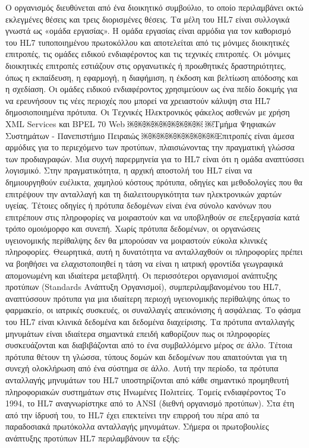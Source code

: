 Ο οργανισμός διευθύνεται από ένα διοικητικό συμβούλιο, το οποίο περιλαμβάνει οκτώ εκλεγμένες θέσεις και τρεις διορισμένες θέσεις. Τα μέλη του HL7 είναι συλλογικά γνωστά ως «ομάδα εργασίας». Η ομάδα εργασίας είναι αρμόδια για τον καθορισμό του HL7 τυποποιημένου πρωτοκόλλου και αποτελείται από τις μόνιμες διοικητικές επιτροπές, τις ομάδες ειδικού ενδιαφέροντος και τις τεχνικές επιτροπές. Οι μόνιμες διοικητικές επιτροπές εστιάζουν στις οργανωτικές ή προωθητικές δραστηριότητες, όπως η εκπαίδευση, η εφαρμογή, η διαφήμιση, η έκδοση και βελτίωση απόδοσης και η σχεδίαση. Οι ομάδες ειδικού ενδιαφέροντος χρησιμεύουν ως ένα πεδίο δοκιμής για να ερευνήσουν τις νέες περιοχές που μπορεί να χρειαστούν κάλυψη στα HL7 δημοσιοποιημένα πρότυπα. Οι Τεχνικές
Ηλεκτρονικός φάκελος ασθενών με χρήση XML Services και BPEL 70 Web
￼￼￼￼￼￼￼￼￼
￼Τμήμα Ψηφιακών Συστημάτων - Πανεπιστήμιο Πειραιώς
￼￼￼￼￼￼￼￼￼Επιτροπές είναι άμεσα αρμόδιες για το περιεχόμενο των προτύπων, πλαισιώνοντας την πραγματική γλώσσα των προδιαγραφών.
Μια συχνή παρερμηνεία για το HL7 είναι ότι η ομάδα αναπτύσσει λογισμικό. Στην πραγματικότητα, η αρχική αποστολή του HL7 είναι να δημιουργηθούν ευέλικτα, χαμηλού κόστους πρότυπα, οδηγίες και μεθοδολογίες που θα επιτρέψουν την ανταλλαγή και τη διαλειτουργικότητα των ηλεκτρονικών χαρτών υγείας. Τέτοιες οδηγίες ή πρότυπα δεδομένων είναι ένα σύνολο κανόνων που επιτρέπουν στις πληροφορίες να μοιραστούν και να υποβληθούν σε επεξεργασία κατά τρόπο ομοιόμορφο και συνεπή. Χωρίς πρότυπα δεδομένων, οι οργανώσεις υγειονομικής περίθαλψης δεν θα μπορούσαν να μοιραστούν εύκολα κλινικές πληροφορίες. Θεωρητικά, αυτή η δυνατότητα να ανταλλαχθούν οι πληροφορίες πρέπει να βοηθήσει να ελαχιστοποιηθεί η τάση να είναι η ιατρική φροντίδα γεωγραφικά απομονωμένη και ιδιαίτερα μεταβλητή.
Οι περισσότεροι οργανισμοί ανάπτυξης προτύπων (Standards Ανάπτυξη Οργανισμοί), συμπεριλαμβανομένου του HL7, αναπτύσσουν πρότυπα για μια ιδιαίτερη περιοχή υγειονομικής περίθαλψης όπως το φαρμακείο, οι ιατρικές συσκευές, οι συναλλαγές απεικόνισης ή ασφάλειας. Το φάσμα του HL7 είναι κλινικά δεδομένα και δεδομένα διαχείρισης. Τα πρότυπα ανταλλαγής μηνυμάτων είναι ιδιαίτερα σημαντικά επειδή καθορίζουν πως οι πληροφορίες συσκευάζονται και διαβιβάζονται από το ένα συμβαλλόμενο μέρος σε άλλο. Τέτοια πρότυπα θέτουν τη γλώσσα, τύπους δομών και δεδομένων που απαιτούνται για τη συνεχή ολοκλήρωση από ένα σύστημα σε άλλο. Αυτή την περίοδο, τα πρότυπα ανταλλαγής μηνυμάτων του HL7 υποστηρίζονται από κάθε σημαντικό προμηθευτή πληροφοριακών συστημάτων στις Ηνωμένες Πολιτείες.
Τομείς ενδιαφέροντος
Το 1994, το HL7 αναγνωρίστηκε από το ANSI (διεθνή οργανισμό προτύπων). Στα έτη από την ίδρυσή του, το HL7 έχει επεκτείνει την επιρροή του πέρα ​​από τα παραδοσιακά πρωτόκολλα ανταλλαγής μηνυμάτων. Σήμερα οι πρωτοβουλίες ανάπτυξης προτύπων HL7 περιλαμβάνουν τα εξής:

